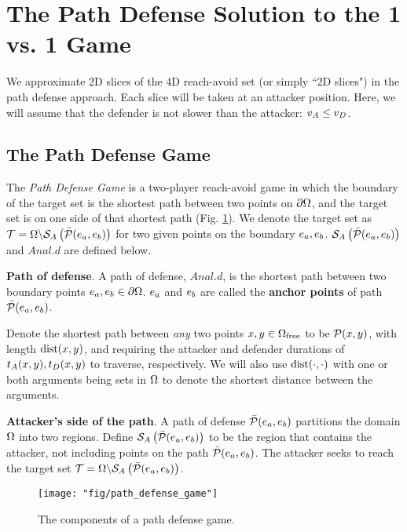 \section{The Path Defense Solution to the 1 vs. 1 Game}
\label{sec:path_defense}
We approximate 2D slices of the 4D reach-avoid set (or simply ``2D slices") in the path defense approach. Each slice will be taken at an attacker position. Here, we will assume that the defender is not slower than the attacker: $v_A \leq v_D$. 

\subsection{The Path Defense Game}
\label{subsec:pd_game}
The \textit{Path Defense Game} is a two-player reach-avoid game in which the boundary of the target set is the shortest path between two points on $\partial\Omega$, and the target set is on one side of that shortest path (Fig. \ref{fig:pd_form}). We denote the target set as $\mathcal{T}=\Omega\backslash\mathcal{S}_A\left(\bar{\mathcal{P}}(e_a,e_b)\right)$ for two given points on the boundary $e_a,e_b$. $\mathcal{S}_A\left(\bar{\mathcal{P}}(e_a,e_b)\right)$ and $Anal.d$ are defined below. 

\begin{defn} %
\textbf{Path of defense}. A path of defense, $Anal.d$, is the shortest path between two boundary points $e_a,e_b\in\partial\Omega$. $e_a$ and $e_b$ are called the \textbf{anchor points} of path $\bar{\mathcal{P}}(e_a,e_b)$. 
\end{defn}

Denote the shortest path between \textit{any} two points $x,y\in\Omega_{\text{free}}$ to be $\mathcal{P}(x,y)$, with length $\text{dist}(x,y)$, and requiring the attacker and defender durations of $t_A(x, y),t_D(x,y)$ to traverse, respectively. We will also use $\text{dist}(\cdot,\cdot)$ with one or both arguments being sets in $\Omega$ to denote the shortest distance between the arguments.

\begin{defn} %
\textbf{Attacker's side of the path}. A path of defense $\bar{\mathcal{P}}(e_a,e_b)$ partitions the domain $\Omega$ into two regions. Define $\mathcal{S}_A\left(\bar{\mathcal{P}}(e_a,e_b)\right)$ to be the region that contains the attacker, not including points on the path $\bar{\mathcal{P}}(e_a,e_b)$. The attacker seeks to reach the target set $\mathcal{T}=\Omega\backslash\mathcal{S}_A\left(\bar{\mathcal{P}}(e_a,e_b)\right)$.
\end{defn}

\begin{figure}
\centering
\texttt{[image: "fig/path\_defense\_game"]}
\caption{The components of a path defense game.}
\label{fig:pd_form}
\end{figure}

